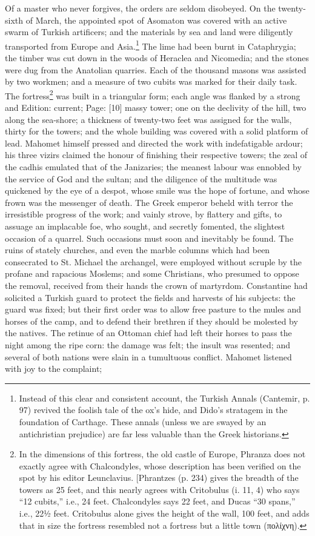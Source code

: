 Of a master who never forgives, the orders are seldom disobeyed. On the twenty-sixth of March, the appointed spot of Asomaton was covered with an active swarm of Turkish artificers; and the materials by sea and land were diligently transported from Europe and Asia.\footnote{Instead of this clear and consistent account, the Turkish Annals (Cantemir, p. 97) revived the foolish tale of the ox\texthebrew{}’s hide, and Dido\texthebrew{}’s stratagem in the foundation of Carthage. These annals (unless we are swayed by an antichristian prejudice) are far less valuable than the Greek historians.} The lime had been burnt in Cataphrygia; the timber was cut down in the woods of Heraclea and Nicomedia; and the stones were dug from the Anatolian quarries. Each of the thousand masons was assisted by two workmen; and a measure of two cubits was marked for their daily task. The fortress\footnote{In the dimensions of this fortress, the old castle of Europe, Phranza does not exactly agree with Chalcondyles, whose description has been verified on the spot by his editor Leunclavius. [Phrantzes (p. 234) gives the breadth of the towers as 25 feet, and this nearly agrees with Critobulus (i. 11, 4) who says \texthebrew{“}12 cubits,\texthebrew{}” i.e., 24 feet. Chalcondyles says 22 feet, and Ducas \texthebrew{“}30 spans,\texthebrew{}” i.e., 22½ feet. Critobulus alone gives the height of the wall, 100 feet, and adds that in size the fortress resembled not a fortress but a little town (\textgreek{πολίχνη}).} was built in a triangular form; each angle was flanked by a strong and Edition: current; Page: [10] massy tower; one on the declivity of the hill, two along the sea-shore; a thickness of twenty-two feet was assigned for the walls, thirty for the towers; and the whole building was covered with a solid platform of lead. Mahomet himself pressed and directed the work with indefatigable ardour; his three vizirs claimed the honour of finishing their respective towers; the zeal of the cadhis emulated that of the Janizaries; the meanest labour was ennobled by the service of God and the sultan; and the diligence of the multitude was quickened by the eye of a despot, whose smile was the hope of fortune, and whose frown was the messenger of death. The Greek emperor beheld with terror the irresistible progress of the work; and vainly strove, by flattery and gifts, to assuage an implacable foe, who sought, and secretly fomented, the slightest occasion of a quarrel. Such occasions must soon and inevitably be found. The ruins of stately churches, and even the marble columns which had been consecrated to St. Michael the archangel, were employed without scruple by the profane and rapacious Moslems; and some Christians, who presumed to oppose the removal, received from their hands the crown of martyrdom. Constantine had solicited a Turkish guard to protect the fields and harvests of his subjects: the guard was fixed; but their first order was to allow free pasture to the mules and horses of the camp, and to defend their brethren if they should be molested by the natives. The retinue of an Ottoman chief had left their horses to pass the night among the ripe corn: the damage was felt; the insult was resented; and several of both nations were slain in a tumultuous conflict. Mahomet listened with joy to the complaint; 